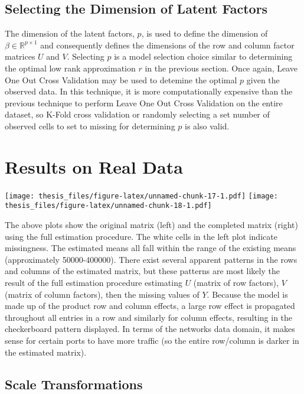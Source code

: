 \documentclass[12pt,twoside]{dukestatscithesis}
\theoremstyle{definition}
\theoremstyle{definition}
\theoremstyle{definition}
\theoremstyle{remark}
\begin{document}
\subsection{Selecting the Dimension of Latent
Factors}\label{selecting-the-dimension-of-latent-factors}

The dimension of the latent factors, \(p\), is used to define the
dimension of \(\beta \in \mathbb{R}^{p \times 1}\) and consequently
defines the dimensions of the row and column factor matrices \(U\) and
\(V\). Selecting \(p\) is a model selection choice similar to
determining the optimal low rank approximation \(r\) in the previous
section. Once again, Leave One Out Cross Validation may be used to
detemine the optimal \(p\) given the observed data. In this technique,
it is more computationally expensive than the previous technique to
perform Leave One Out Cross Validation on the entire dataset, so K-Fold
cross validation or randomly selecting a set number of observed cells to
set to missing for determining \(p\) is also valid.

\section{Results on Real Data}\label{results-on-real-data-1}

\texttt{[image: thesis\_files/figure-latex/unnamed-chunk-17-1.pdf]}
\texttt{[image: thesis\_files/figure-latex/unnamed-chunk-18-1.pdf]}

The above plots show the original matrix (left) and the completed matrix
(right) using the full estimation procedure. The white cells in the left
plot indicate missingness. The estimated means all fall within the range
of the existing means (approximately 50000-400000). There exist several
apparent patterns in the rows and columns of the estimated matrix, but
these patterns are most likely the result of the full estimation
procedure estimating \(U\) (matrix of row factors), \(V\) (matrix of
column factors), then the missing values of \(Y\). Because the model is
made up of the product row and column effects, a large row effect is
propagated throughout all entries in a row and similarly for column
effects, resulting in the checkerboard pattern displayed. In terms of
the networks data domain, it makes sense for certain ports to have more
traffic (so the entire row/column is darker in the estimated matrix).

\subsection{Scale Transformations}\label{scale-transformations-1}
\end{document}
